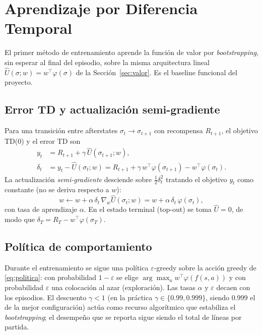 \section{Aprendizaje por Diferencia Temporal}
\label{sec:td}

El primer método de entrenamiento aprende la función de valor por
\emph{bootstrapping}, sin esperar al final del episodio, sobre la misma
arquitectura lineal $\hat{U}(\sigma; w) = w^{\top}\varphi(\sigma)$ de la
Sección~\ref{sec:valor}. Es el baseline funcional del proyecto.

\subsection{Error TD y actualización semi-gradiente}
Para una transición entre afterstates $\sigma_t \to \sigma_{t+1}$ con recompensa
$R_{t+1}$, el objetivo TD(0) y el error TD son
\begin{align}
  y_t &= R_{t+1} + \gamma\, \hat{U}(\sigma_{t+1}; w), \label{eq:td-target}\\
  \delta_t &= y_t - \hat{U}(\sigma_t; w)
           = R_{t+1} + \gamma\, w^{\top}\varphi(\sigma_{t+1})
             - w^{\top}\varphi(\sigma_t). \label{eq:td-error}
\end{align}
La actualización \emph{semi-gradiente} desciende sobre $\tfrac{1}{2}\delta_t^{2}$
tratando el objetivo $y_t$ como constante (no se deriva respecto a $w$):
\begin{equation}
  w \leftarrow w + \alpha\, \delta_t\, \nabla_w \hat{U}(\sigma_t; w)
            = w + \alpha\, \delta_t\, \varphi(\sigma_t),
  \label{eq:td-update}
\end{equation}
con tasa de aprendizaje $\alpha$. En el estado terminal (top-out) se toma
$\hat{U} = 0$, de modo que $\delta_T = R_T - w^{\top}\varphi(\sigma_T)$.

\subsection{Política de comportamiento}
Durante el entrenamiento se sigue una política $\varepsilon$-greedy sobre la
acción greedy de \eqref{eq:politica}: con probabilidad $1-\varepsilon$ se elige
$\arg\max_a w^{\top}\varphi(f(s,a))$ y con probabilidad $\varepsilon$ una
colocación al azar (exploración). Las tasas $\alpha$ y $\varepsilon$ decaen con
los episodios. El descuento $\gamma < 1$ (en la práctica $\gamma \in \{0.99, 0.999\}$,
siendo $0.999$ el de la mejor configuración) actúa como recurso algorítmico que
estabiliza el \emph{bootstrapping}; el desempeño que se reporta sigue siendo el
total de líneas por partida.

